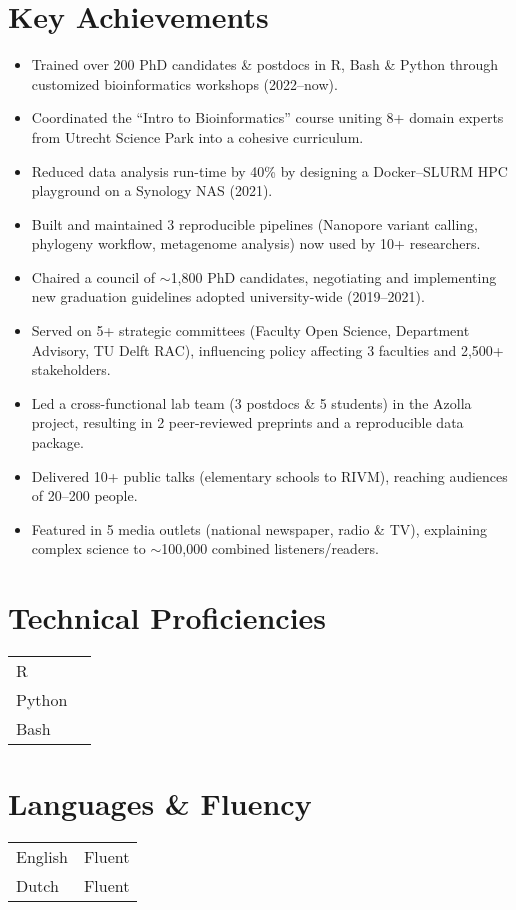 \documentclass[a4paper,10pt]{article}
\begin{document}
\section*{Key Achievements}
\begin{itemize}
  \item Trained over 200 PhD candidates \& postdocs in R, Bash \& Python through customized bioinformatics workshops (2022--now).
  \item Coordinated the “Intro to Bioinformatics” course uniting 8+ domain experts from Utrecht Science Park into a cohesive curriculum.
  \item Reduced data analysis run-time by 40\% by designing a Docker--SLURM HPC playground on a Synology NAS (2021).
  \item Built and maintained 3 reproducible pipelines (Nanopore variant calling, phylogeny workflow, metagenome analysis) now used by 10+ researchers.
  \item Chaired a council of $\sim$1,800 PhD candidates, negotiating and implementing new graduation guidelines adopted university-wide (2019--2021).
  \item Served on 5+ strategic committees (Faculty Open Science, Department Advisory, TU Delft RAC), influencing policy affecting 3 faculties and 2,500+ stakeholders.
  \item Led a cross-functional lab team (3 postdocs \& 5 students) in the Azolla project, resulting in 2 peer-reviewed preprints and a reproducible data package.
  \item Delivered 10+ public talks (elementary schools to RIVM), reaching audiences of 20--200 people.
  \item Featured in 5 media outlets (national newspaper, radio \& TV), explaining complex science to $\sim$100,000 combined listeners/readers.
\end{itemize}

\MySkip

\begin{multicols}{2}
\section*{Technical Proficiencies}
\begin{tabular}{ll}
  R       & \SkillBull{$\bullet\bullet\bullet\bullet$} \\
  Python  & \SkillBull{$\bullet\bullet\bullet\bullet$} \\
  Bash    & \SkillBull{$\bullet\bullet\bullet\circ$} \\
\end{tabular}

\vfill\null \columnbreak

\section*{Languages \& Fluency}
\begin{tabular}{ll}
  English & Fluent \\
  Dutch   & Fluent \\
\end{tabular}

\end{multicols}
\end{document}
